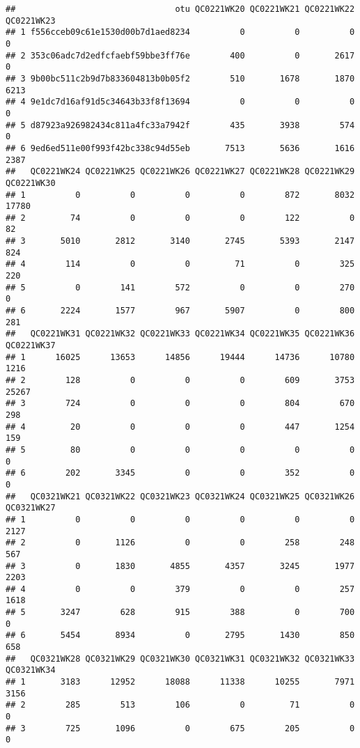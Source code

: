 \documentclass[
]{article}
\begin{document}
\begin{verbatim}
##                                otu QC0221WK20 QC0221WK21 QC0221WK22 QC0221WK23
## 1 f556cceb09c61e1530d00b7d1aed8234          0          0          0          0
## 2 353c06adc7d2edfcfaebf59bbe3ff76e        400          0       2617          0
## 3 9b00bc511c2b9d7b833604813b0b05f2        510       1678       1870       6213
## 4 9e1dc7d16af91d5c34643b33f8f13694          0          0          0          0
## 5 d87923a926982434c811a4fc33a7942f        435       3938        574          0
## 6 9ed6ed511e00f993f42bc338c94d55eb       7513       5636       1616       2387
##   QC0221WK24 QC0221WK25 QC0221WK26 QC0221WK27 QC0221WK28 QC0221WK29 QC0221WK30
## 1          0          0          0          0        872       8032      17780
## 2         74          0          0          0        122          0         82
## 3       5010       2812       3140       2745       5393       2147        824
## 4        114          0          0         71          0        325        220
## 5          0        141        572          0          0        270          0
## 6       2224       1577        967       5907          0        800        281
##   QC0221WK31 QC0221WK32 QC0221WK33 QC0221WK34 QC0221WK35 QC0221WK36 QC0221WK37
## 1      16025      13653      14856      19444      14736      10780       1216
## 2        128          0          0          0        609       3753      25267
## 3        724          0          0          0        804        670        298
## 4         20          0          0          0        447       1254        159
## 5         80          0          0          0          0          0          0
## 6        202       3345          0          0        352          0          0
##   QC0321WK21 QC0321WK22 QC0321WK23 QC0321WK24 QC0321WK25 QC0321WK26 QC0321WK27
## 1          0          0          0          0          0          0       2127
## 2          0       1126          0          0        258        248        567
## 3          0       1830       4855       4357       3245       1977       2203
## 4          0          0        379          0          0        257       1618
## 5       3247        628        915        388          0        700          0
## 6       5454       8934          0       2795       1430        850        658
##   QC0321WK28 QC0321WK29 QC0321WK30 QC0321WK31 QC0321WK32 QC0321WK33 QC0321WK34
## 1       3183      12952      18088      11338      10255       7971       3156
## 2        285        513        106          0         71          0          0
## 3        725       1096          0        675        205          0          0

\end{verbatim}
\end{document}
